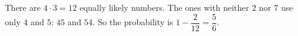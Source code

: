 There are $4\cdot3=12$ equally likely numbers. The ones with neither $2$ nor $7$ use only $4$ and $5$: $45$ and $54$. So the probability is $1-\dfrac2{12}=\boxed{\dfrac56}$.
